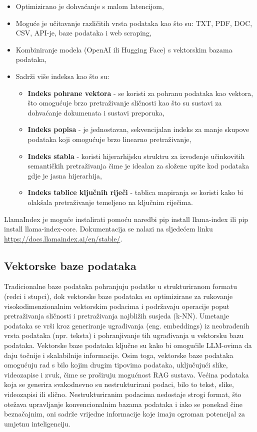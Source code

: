 \documentclass[]{foi}
\begin{document}
\begin{itemize}
    \item Optimizirano je dohvaćanje s malom latencijom,
    \item Moguće je učitavanje različitih vrsta podataka kao što su: TXT, PDF, DOC, CSV, API-je, baze podataka i web scraping,
    \item Kombiniranje modela (OpenAI ili Hugging Face) s vektorskim bazama podataka,
    \item Sadrži više indeksa kao što su:
    \begin{itemize}
        \item \textbf{Indeks pohrane vektora} - se koristi za pohranu podataka kao vektora, što omogućuje brzo pretraživanje sličnosti kao što su sustavi za dohvaćanje dokumenata i sustavi preporuka,
        \item \textbf{Indeks popisa} - je jednostavan, sekvencijalan indeks za manje skupove podataka koji omogućuje brzo linearno pretraživanje,
        \item \textbf{Indeks stabla} - koristi hijerarhijsku struktru za izvođenje učinkovitih semantičkih pretraživanja čime je idealan za složene upite kod podataka gdje je jasna hijerarhija,
        \item \textbf{Indeks tablice ključnih riječi} - tablica mapiranja se koristi kako bi olakšala pretraživanje temeljeno na ključnim riječima.
    \end{itemize}
\end{itemize}

LlamaIndex je moguće instalirati pomoću naredbi pip install llama-index ili pip install llama-index-core. Dokumentacija se nalazi na sljedećem linku \url{https://docs.llamaindex.ai/en/stable/}.

\subsection{Vektorske baze podataka}
Tradicionalne baze podataka pohranjuju podatke u strukturiranom formatu (redci i stupci), dok vektorske baze podataka su optimizirane za rukovanje
visokodimenzionalnim vektorskim podacima i podržavaju operacije poput pretraživanja sličnosti i pretraživanja najbližih susjeda (k-NN). Umetanje
podataka se vrši kroz generiranje ugrađivanja (eng. embeddings) iz neobrađenih vrsta podataka (npr. teksta) i pohranjivanje tih ugrađivanja u vektorsku bazu podataka.
Vektorske baze podataka ključne su kako bi omogućile LLM-ovima da daju točnije i skalabilnije informacije. 
Osim toga, vektorske baze podataka omogućuju rad s bilo kojim drugim tipovima podataka, uključujući slike, videozapise i zvuk, čime se proširuju mogućnost RAG sustava.
Većina podataka koja se generira svakodnevno su nestrukturirani podaci, bilo to tekst, slike, videozapisi ili slično. 
Nestrukturiranim podacima nedostaje strogi format, što otežava upravljanje konvencionalnim bazama podataka i iako se ponekad čine beznačajnim,
oni sadrže vrijedne informacije koje imaju ogroman potencijal za umjetnu inteligenciju.
\end{document}
